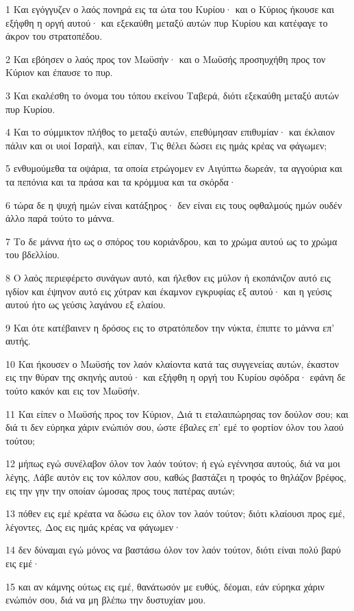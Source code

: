 \par 1 Και εγόγγυζεν ο λαός πονηρά εις τα ώτα του Κυρίου· και ο Κύριος ήκουσε και εξήφθη η οργή αυτού· και εξεκαύθη μεταξύ αυτών πυρ Κυρίου και κατέφαγε το άκρον του στρατοπέδου.
\par 2 Και εβόησεν ο λαός προς τον Μωϋσήν· και ο Μωϋσής προσηυχήθη προς τον Κύριον και έπαυσε το πυρ.
\par 3 Και εκαλέσθη το όνομα του τόπου εκείνου Ταβερά, διότι εξεκαύθη μεταξύ αυτών πυρ Κυρίου.
\par 4 Και το σύμμικτον πλήθος το μεταξύ αυτών, επεθύμησαν επιθυμίαν· και έκλαιον πάλιν και οι υιοί Ισραήλ, και είπαν, Τις θέλει δώσει εις ημάς κρέας να φάγωμεν;
\par 5 ενθυμούμεθα τα οψάρια, τα οποία ετρώγομεν εν Αιγύπτω δωρεάν, τα αγγούρια και τα πεπόνια και τα πράσα και τα κρόμμυα και τα σκόρδα·
\par 6 τώρα δε η ψυχή ημών είναι κατάξηρος· δεν είναι εις τους οφθαλμούς ημών ουδέν άλλο παρά τούτο το μάννα.
\par 7 Το δε μάννα ήτο ως ο σπόρος του κοριάνδρου, και το χρώμα αυτού ως το χρώμα του βδελλίου.
\par 8 Ο λαός περιεφέρετο συνάγων αυτό, και ήλεθον εις μύλον ή εκοπάνιζον αυτό εις ιγδίον και έψηνον αυτό εις χύτραν και έκαμνον εγκρυφίας εξ αυτού· και η γεύσις αυτού ήτο ως γεύσις λαγάνου εξ ελαίου.
\par 9 Και ότε κατέβαινεν η δρόσος εις το στρατόπεδον την νύκτα, έπιπτε το μάννα επ' αυτής.
\par 10 Και ήκουσεν ο Μωϋσής τον λαόν κλαίοντα κατά τας συγγενείας αυτών, έκαστον εις την θύραν της σκηνής αυτού· και εξήφθη η οργή του Κυρίου σφόδρα· εφάνη δε τούτο κακόν και εις τον Μωϋσήν.
\par 11 Και είπεν ο Μωϋσής προς τον Κύριον, Διά τι εταλαιπώρησας τον δούλον σου; και διά τι δεν εύρηκα χάριν ενώπιόν σου, ώστε έβαλες επ' εμέ το φορτίον όλον του λαού τούτου;
\par 12 μήπως εγώ συνέλαβον όλον τον λαόν τούτον; ή εγώ εγέννησα αυτούς, διά να μοι λέγης, Λάβε αυτόν εις τον κόλπον σου, καθώς βαστάζει η τροφός το θηλάζον βρέφος, εις την γην την οποίαν ώμοσας προς τους πατέρας αυτών;
\par 13 πόθεν εις εμέ κρέατα να δώσω εις όλον τον λαόν τούτον; διότι κλαίουσι προς εμέ, λέγοντες, Δος εις ημάς κρέας να φάγωμεν·
\par 14 δεν δύναμαι εγώ μόνος να βαστάσω όλον τον λαόν τούτον, διότι είναι πολύ βαρύ εις εμέ·
\par 15 και αν κάμνης ούτως εις εμέ, θανάτωσόν με ευθύς, δέομαι, εάν εύρηκα χάριν ενώπιόν σου, διά να μη βλέπω την δυστυχίαν μου.
